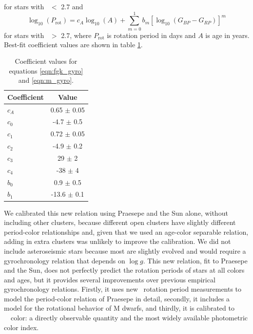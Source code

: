 for stars with \gcolor\ $<$ 2.7 and
\begin{equation}
    \log_{10}(P_\mathrm{rot}) =
    c_A\log_{10}(A) +
    \sum_{m=0}^1 b_m[\log_{10}(G_{BP}-G_{RP})]^m
\label{eqn:m_gyro}
\end{equation}
for stars with \gcolor\ $>$ 2.7, where $P_{\mathrm{rot}}$ is rotation period
in days and $A$ is age in years.
Best-fit coefficient values are shown in table \ref{tab:coefficients}.
\begin{table}[h!]
  \begin{center}
      \caption{Coefficient values for equations \ref{eqn:fgk_gyro} and
      \ref{eqn:m_gyro}.}
    \label{tab:coefficients}
    \begin{tabular}{l|c} %
      Coefficient & Value  \\
      \hline
      $c_A$ & 0.65 $\pm$ 0.05 \\
      $c_0$ & -4.7 $\pm$ 0.5 \\
      $c_1$ & 0.72 $\pm$ 0.05 \\
      $c_2$ & -4.9 $\pm$ 0.2 \\
      $c_3$ & 29 $\pm$ 2 \\
      $c_4$ & -38 $\pm$ 4 \\
      $b_0$ & 0.9 $\pm$ 0.5 \\
      $b_1$ & -13.6 $\pm$ 0.1 \\
    \end{tabular}
  \end{center}
\end{table}

We calibrated this new relation using Praesepe and the Sun alone, without
including other clusters, because different open clusters have slightly
different period-color relationships \citep{agueros2018, agueros2018b,
curtis2018} and, given that we used an age-color separable relation, adding in
extra clusters was unlikely to improve the calibration.
We did not include asteroseismic stars because most are slightly evolved and
would require a gyrochronology relation that depends on $\log g$.
This new relation, fit to Praesepe and the Sun, does not perfectly predict the
rotation periods of stars at all colors and ages, but it provides several
improvements over previous empirical gyrochronology relations.
Firstly, it uses new \ktwo\ rotation period measurements to model the
period-color relation of Praesepe in detail, secondly, it includes a model for
the rotational behavior of M dwarfs, and thirdly, it is calibrated to \Gaia\
\gcolor\ color: a directly observable quantity and the most widely available
photometric color index.

